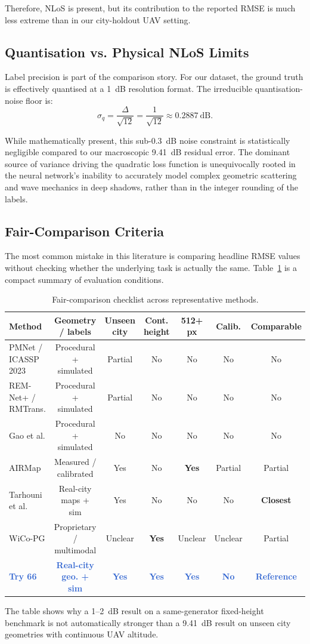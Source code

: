 \documentclass[11pt,a4paper]{article}
\newcommand{\better}[1]{\textcolor{good}{\textbf{#1}}}
\newcommand{\ours}[1]{\textcolor{highlight}{\textbf{#1}}}
\begin{document}
Therefore, NLoS is present, but its contribution to the reported RMSE is
much less extreme than in our city-holdout UAV setting.

\subsection{Quantisation vs. Physical NLoS Limits}

Label precision is part of the comparison story. For our dataset, the ground truth is effectively quantised at a 1~dB resolution format. The irreducible quantisation-noise floor is:
\[
    \sigma_q = \frac{\Delta}{\sqrt{12}} = \frac{1}{\sqrt{12}} \approx 0.2887~\mathrm{dB}.
\]

While mathematically present, this sub-0.3~dB noise constraint is statistically negligible compared to our macroscopic 9.41~dB residual error. The dominant source of variance driving the quadratic loss function is unequivocally rooted in the neural network's inability to accurately model complex geometric scattering and wave mechanics in deep shadows, rather than in the integer rounding of the labels.

\subsection{Fair-Comparison Criteria}

The most common mistake in this literature is comparing headline RMSE values
without checking whether the underlying task is actually the same. Table~\ref{tab:fairness} is a compact summary of evaluation conditions.

\begin{table}[h!]
\centering
\caption{Fair-comparison checklist across representative methods.}
\label{tab:fairness}
\footnotesize
\begin{tabularx}{\textwidth}{Xcccccc}
\toprule
\textbf{Method} & \textbf{Geometry / labels} & \textbf{Unseen city} & \textbf{Cont. height}
& \textbf{512+ px} & \textbf{Calib.} & \textbf{Comparable} \\
\midrule
PMNet / ICASSP 2023 & Procedural + simulated & Partial & No & No & No & No \\
REM-Net+ / RMTrans. & Procedural + simulated & Partial & No & No & No & No \\
Gao et al. & Procedural + simulated & No & No & No & No & No \\
AIRMap & Measured / calibrated & Yes & No & \better{Yes} & Partial & Partial \\
Tarhouni et al. & Real-city maps + sim & Yes & No & No & No & \better{Closest} \\
WiCo-PG & Proprietary / multimodal & Unclear & \better{Yes} & Unclear & Unclear & Partial \\
\ours{Try 66} & \ours{Real-city geo. + sim} & \ours{Yes} & \ours{Yes} & \ours{Yes} & \ours{No} & \ours{Reference} \\
\bottomrule
\end{tabularx}
\end{table}
\normalsize
The table shows why a 1--2~dB result on a same-generator fixed-height benchmark
is not automatically stronger than a 9.41~dB result on unseen city geometries with
continuous UAV altitude. 
\end{document}
